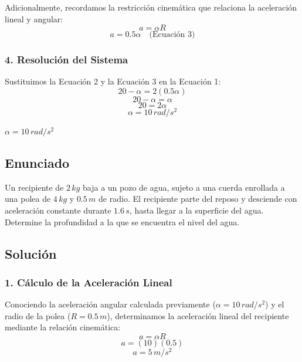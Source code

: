 \documentclass[12pt, a4paper]{article}
\begin{document}
Adicionalmente, recordamos la restricción cinemática que relaciona la aceleración lineal y angular:
$$a = \alpha R$$
$$a = 0.5 \alpha \quad \text{(Ecuación 3)}$$

\subsubsection*{4. Resolución del Sistema}
Sustituimos la Ecuación 2 y la Ecuación 3 en la Ecuación 1:
$$20 - \alpha = 2 (0.5 \alpha)$$
$$20 - \alpha = \alpha$$
$$20 = 2 \alpha$$
$$\alpha = 10 \, \si{rad/s^2}$$

\begin{tcolorbox}[colback=green!5!white, colframe=green!50!black, title=Respuesta Final]
\centering \Large $\alpha = 10 \, \si{rad/s^2}$
\end{tcolorbox}

\newpage

\subsection*{Enunciado}
Un recipiente de $2 \, \si{kg}$ baja a un pozo de agua, sujeto a una cuerda enrollada a una polea de $4 \, \si{kg}$ y $0.5 \, \si{m}$ de radio. El recipiente parte del reposo y desciende con aceleración constante durante $1.6 \, \si{s}$, hasta llegar a la superficie del agua. Determine la profundidad a la que se encuentra el nivel del agua.

\begin{center}
\end{center}

\subsection*{Solución}

\subsubsection*{1. Cálculo de la Aceleración Lineal}
Conociendo la aceleración angular calculada previamente ($\alpha = 10 \, \si{rad/s^2}$) y el radio de la polea ($R = 0.5 \, \si{m}$), determinamos la aceleración lineal del recipiente mediante la relación cinemática:
$$a = \alpha R$$
$$a = (10) (0.5)$$
$$a = 5 \, \si{m/s^2}$$
\end{document}
